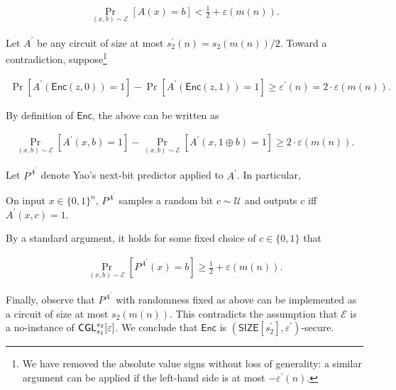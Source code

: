 \[\begin{gathered}
\Pr_{(x,b)\sim\mathcal{E}}[A(x)=b]<\frac{1}{2}+\varepsilon(m(n)).
\end{gathered}\]


Let $A^{\prime}$ be any circuit of size at most $s_{2}^{\prime}(n)=s_{2}(m(n))/2$. Toward a contradiction, suppose\footnote{We have removed the absolute value signs without loss of generality: a similar argument can be applied if the left-hand side is at most $-\varepsilon^{\prime}(n)$.}\par


\[\begin{gathered}
\Pr[A^{\prime}({\mathsf{Enc}}(z,0))=1]-\Pr[A^{\prime}({\mathsf{Enc}}(z,1))=1]\geq\varepsilon^{\prime}(n)=2\cdot\varepsilon(m(n)).
\end{gathered}\]


By definition of ${\mathsf{Enc}}$, the above can be written as\par


\[\begin{gathered}
\Pr_{(x,b)\sim\mathcal{E}}[A^{\prime}(x,b)=1]-\Pr_{(x,b)\sim\mathcal{E}}[A^{\prime}(x,1\oplus b)=1]\geq 2\cdot\varepsilon(m(n)).
\end{gathered}\]


Let $P^{A^{\prime}}$ denote Yao’s next-bit predictor applied to $A^{\prime}$. In particular,\par



On input $x\in\{0,1\}^{n}$, $P^{A^{\prime}}$ samples a random bit $c\sim\mathcal{U}$ and outputs $c$ iff $A^{\prime}(x,c)=1$.\par



By a standard argument, it holds for some fixed choice of $c\in\{0,1\}$ that\par


\[\begin{gathered}
\Pr_{(x,b)\sim\mathcal{E}}[P^{A^{\prime}}(x)=b]\geq\frac{1}{2}+\varepsilon(m(n)).
\end{gathered}\]


Finally, observe that $P^{A^{\prime}}$ with randomness fixed as above can be implemented as a circuit of size at most $s_{2}(m(n))$. This contradicts the assumption that $\mathcal{E}$ is a no-instance of ${\sf CGL}_{s_{1}}^{s_{2}}[\varepsilon]$. We conclude that ${\mathsf{Enc}}$ is $({\mathsf{SIZE}}[s_{2}^{\prime}],\varepsilon^{\prime})$-secure.\par





